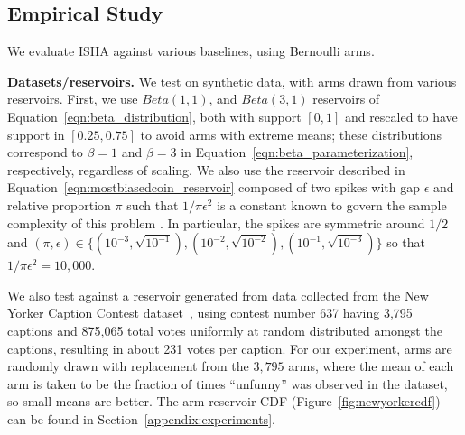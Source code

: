 
\subsection {Empirical Study}\label{experiments}
We evaluate ISHA against various baselines,
using Bernoulli arms.


\textbf{Datasets/reservoirs.}
We test on synthetic data, with arms drawn from various reservoirs.
First, we use $Beta(1,1)$, and $Beta(3,1)$ reservoirs of Equation~\ref{eqn:beta_distribution},
both with support $[0,1]$ and rescaled to have support in $[0.25,0.75]$
to avoid arms with extreme means; these distributions correspond to $\beta=1$ and $\beta=3$ in Equation~\ref{eqn:beta_parameterization}, respectively, regardless of scaling. 
We also use the reservoir described in Equation~\ref{eqn:mostbiasedcoin_reservoir} composed of two spikes with gap $\epsilon$ and relative proportion $\pi$ such that $1/{\pi \epsilon^2}$ is a constant known to govern the sample complexity of this problem \citep{chandrasekaran2014finding,malloy2012quickest,jamieson2016power}.
In particular, the spikes are symmetric around $1/2$ and $(\pi,\epsilon) \in \{(10^{-3},\sqrt{10^{-1}}), (10^{-2},\sqrt{10^{-2}}), (10^{-1},\sqrt{10^{-3}})\}$ so that $1/{\pi \epsilon^2}=10,000$.

We also test against a reservoir generated from data collected from the New Yorker Caption Contest dataset~\citep{NIPS2015_5868},
using contest number 637 having 3,795 captions and 875,065 total votes uniformly at random distributed amongst the captions, resulting in about 231 votes per caption. For our experiment, arms are randomly drawn with replacement from the $3,795$ arms, where the mean of each arm is taken to be the fraction of times ``unfunny'' was observed in the dataset, so small means are better. The arm reservoir CDF (Figure~\ref{fig:newyorkercdf}) can be found in Section~\ref{appendix:experiments}.



